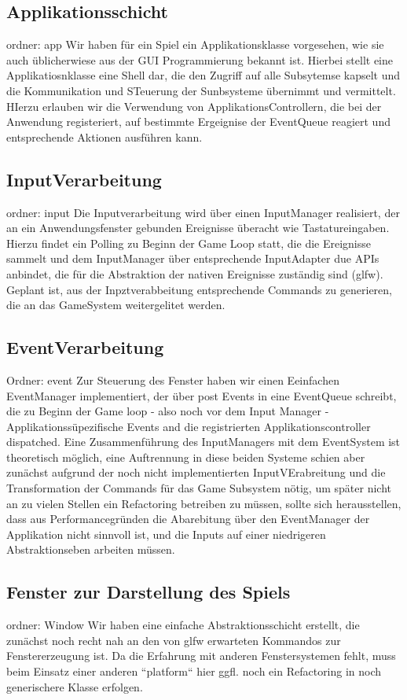 \subsection{Applikationsschicht}
ordner: app
Wir haben für ein Spiel ein Applikationsklasse vorgesehen, wie sie auch üblicherwiese aus der GUI Programmierung bekannt ist. Hierbei stellt eine Applikatiosnklasse eine Shell dar, die den Zugriff auf alle Subsytemse kapselt und die Kommunikation und STeuerung der Sunbsysteme übernimmt und vermittelt.
HIerzu erlauben wir die Verwendung von ApplikationsControllern, die bei der Anwendung registeriert, auf bestimmte Ergeignise der EventQueue reagiert und entsprechende Aktionen ausführen kann.

\subsection{InputVerarbeitung}
ordner: input
Die Inputverarbeitung wird über einen InputManager realisiert, der an ein Anwendungsfenster gebunden Ereignisse überacht wie Tastatureingaben. Hierzu findet ein Polling zu Beginn der Game Loop statt, die die Ereignisse sammelt und dem InputManager über entsprechende InputAdapter due APIs anbindet, die für die Abstraktion der nativen Ereignisse zuständig sind (glfw).
Geplant ist, aus der Inpztverabbeitung entsprechende Commands zu generieren, die an das GameSystem weitergelitet werden.

\subsection{EventVerarbeitung}
Ordner: event
Zur Steuerung des Fenster haben wir einen Eeinfachen EventManager implementiert, der über post Events in eine EventQueue schreibt, die zu Beginn der Game loop - also noch vor dem Input Manager - Applikationssüpezifische Events and die registrierten Applikationscontroller dispatched. Eine Zusammenführung des InputManagers mit dem EventSystem ist theoretisch möglich, eine Auftrennung in diese beiden Systeme schien aber zunächst aufgrund der noch nicht implementierten InputVErabreitung und die Transformation der Commands für das Game Subsystem nötig, um später nicht an zu vielen Stellen ein Refactoring betreiben zu müssen, sollte sich herausstellen, dass aus Performancegründen die Abarebitung über den EventManager der Applikation nicht sinnvoll ist, und die Inputs auf einer niedrigeren Abstraktionseben arbeiten müssen.

\subsection{Fenster zur Darstellung des Spiels}
ordner: Window
Wir haben eine einfache Abstraktionsschicht erstellt, die zunächst noch recht nah an den von glfw erwarteten Kommandos zur Fenstererzeugung ist. Da die Erfahrung mit anderen Fenstersystemen fehlt, muss beim Einsatz einer anderen ``platform`` hier ggfl. noch ein Refactoring in noch generischere Klasse erfolgen.

